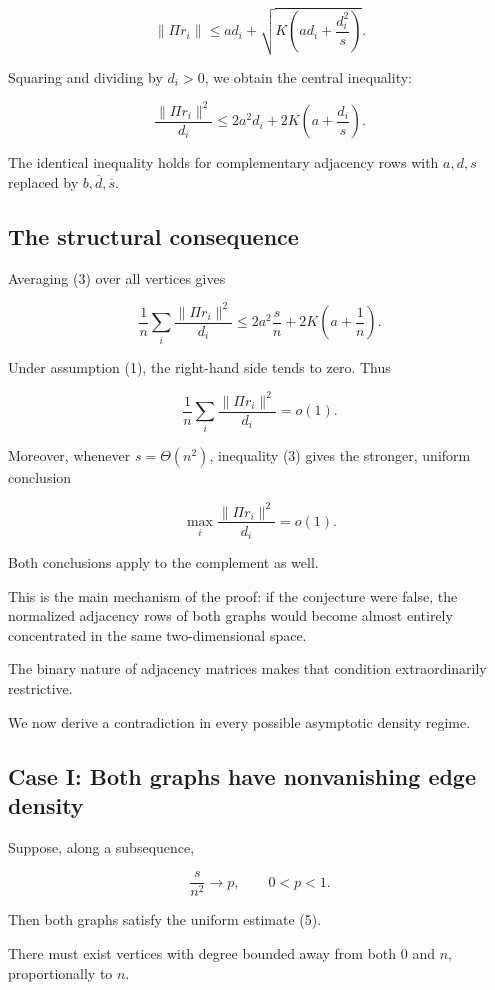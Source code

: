 \documentclass[11pt]{article}
\begin{document}
\[
\|\Pi r_i\|
\leq a d_i+
\sqrt{K\left(a d_i+\frac{d_i^2}{s}\right)}.
\]

Squaring and dividing by \(d_i>0\), we obtain the central inequality:

\[
\boxed{
\frac{\|\Pi r_i\|^2}{d_i}
\leq
2a^2d_i+2K\left(a+\frac{d_i}{s}\right).
}
\tag{3}
\]

The identical inequality holds for complementary adjacency rows with \(a,d,s\) replaced by \(b,\overline d,\overline s\).

\subsection{The structural consequence}

Averaging (3) over all vertices gives

\[
\frac1n\sum_i
\frac{\|\Pi r_i\|^2}{d_i}
\leq
2a^2\frac{s}{n}
+2K\left(a+\frac1n\right).
\]

Under assumption (1), the right-hand side tends to zero. Thus

\[
\boxed{
\frac1n\sum_i
\frac{\|\Pi r_i\|^2}{d_i}=o(1).
}
\tag{4}
\]

Moreover, whenever \(s=\Theta(n^2)\), inequality (3) gives the stronger, uniform conclusion

\[
\boxed{
\max_i\frac{\|\Pi r_i\|^2}{d_i}=o(1).
}
\tag{5}
\]

Both conclusions apply to the complement as well.

This is the main mechanism of the proof: if the conjecture were false, the normalized adjacency rows of both graphs would become almost entirely concentrated in the same two-dimensional space.

The binary nature of adjacency matrices makes that condition extraordinarily restrictive.

We now derive a contradiction in every possible asymptotic density regime.

\subsection{Case I: Both graphs have nonvanishing edge density}

Suppose, along a subsequence,

\[
\frac{s}{n^2}\longrightarrow p,
\qquad 0<p<1.
\]

Then both graphs satisfy the uniform estimate (5).

There must exist vertices with degree bounded away from both 0 and \(n\), proportionally to \(n\).
\end{document}
